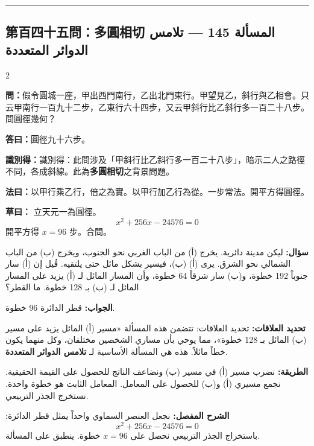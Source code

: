 \documentclass[11pt,a4paper]{article}
\newcommand{\ar}[1]{\arabicfont\beginR #1\endR}
\newcommand{\arb}[1]{\textbf{\arabicfont\beginR #1\endR}}
\newcommand{\longline}{\noindent\rule{\textwidth}{0.4pt}}
\newcommand{\arnote}[1]{\textcolor{arabicblue}{\ar{#1}}}
\newcommand{\wen}[1]{\par\noindent\textbf{\textcolor{probcolor}{問：}}{#1}\par}
\newcommand{\da}[1]{\par\noindent\textbf{\textcolor{anscolor}{答曰：}}{#1}\par}
\newcommand{\fayue}[1]{\par\noindent\textbf{\textcolor{methodcolor}{法曰：}}{#1}\par}
\newcommand{\caoyue}[1]{\par\noindent\textbf{草曰：}{#1}\par}
\newcommand{\zhi}[1]{\par\noindent\textbf{識別得：}{#1}\par}
\newcommand{\arwen}[1]{\par\noindent\arb{سؤال: }\arnote{#1}\par}
\newcommand{\arjwb}[1]{\par\noindent\arb{الجواب: }\arnote{#1}\par}
\newcommand{\arqwd}[1]{\par\noindent\arb{الطريقة: }\arnote{#1}\par}
\newcommand{\arshr}[1]{\par\noindent\arb{الشرح المفصل: }\arnote{#1}\par}
\newcommand{\arfl}[1]{\par\noindent\arb{تحديد العلاقات: }\arnote{#1}\par}
\begin{document}
\vspace{0.3cm}
\longline

\subsection*{第百四十五問：多圓相切 \hfill \ar{المسألة 145 — تلامس الدوائر المتعددة}}

\begin{paracol}{2}

\begin{leftcolumn}
\wen{假令圓城一座，甲出西門南行，乙出北門東行。甲望見乙，斜行與乙相會。只云甲南行一百九十二步，乙東行六十四步，又云甲斜行比乙斜行多一百二十八步。問圓徑幾何？}

\da{圓徑九十六步。}

\zhi{識別得：此問涉及「甲斜行比乙斜行多一百二十八步」，暗示二人之路徑不同，各成斜線。此為\textbf{多圓相切}之背景問題。}

\fayue{以甲行乘乙行，倍之為實。以甲行加乙行為從。一步常法。開平方得圓徑。}

\caoyue{
立天元一為圓徑。
$$x^2 + 256x - 24576 = 0$$
開平方得 $x = 96$ 步。合問。}
\end{leftcolumn}

\begin{rightcolumn}
\arwen{ليكن مدينة دائرية. يخرج (أ) من الباب الغربي نحو الجنوب، ويخرج (ب) من الباب الشمالي نحو الشرق. يرى (أ) (ب)، فيسير بشكل مائل حتى يلتقيه. قُيل إن (أ) سار جنوباً 192 خطوة، و(ب) سار شرقاً 64 خطوة، وأن المسار المائل لـ (أ) يزيد على المسار المائل لـ (ب) بـ 128 خطوة. ما القطر؟}

\arjwb{قطر الدائرة 96 خطوة.}

\arfl{تحديد العلاقات: تتضمن هذه المسألة «مسير (أ) المائل يزيد على مسير (ب) المائل بـ 128 خطوة»، مما يوحي بأن مساري الشخصين مختلفان، وكل منهما يكون خطاً مائلاً. هذه هي المسألة الأساسية لـ \textbf{تلامس الدوائر المتعددة}.}

\arqwd{نضرب مسير (أ) في مسير (ب) ونضاعف الناتج للحصول على القيمة الحقيقية. نجمع مسيري (أ) و(ب) للحصول على المعامل. المعامل الثابت هو خطوة واحدة. نستخرج الجذر التربيعي.}

\arshr{نجعل العنصر السماوي واحداً يمثل قطر الدائرة:
$$x^2 + 256x - 24576 = 0$$
باستخراج الجذر التربيعي نحصل على $x = 96$ خطوة. ينطبق على المسألة.}
\end{rightcolumn}

\end{paracol}
\end{document}
